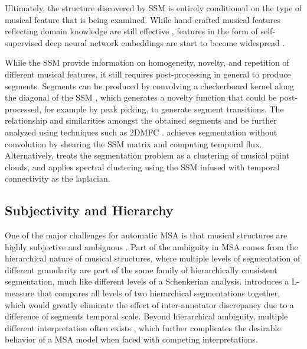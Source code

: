 Ultimately, the structure discovered by SSM is entirely conditioned on the type of musical feature that is being examined.
While hand-crafted musical features reflecting domain knowledge are still effective \citep{mcfee2014_spectral}, features in the form of self-supervised deep neural network embeddings are start to become widespread \citep{salamon2021, mccallum2019unsupervised}.

While the SSM provide information on homogeneity, novelty, and repetition of different musical features, it still requires post-processing in general to produce segments.
Segments can be produced by convolving a checkerboard kernel along the diagonal of the SSM \citep{foote2000automatic}, which generates a novelty function that could be post-processed, for example by peak picking, to generate segment transitions.
The relationship and similarities amongst the obtained segments and be further analyzed using techniques such as 2DMFC \citep{nieto2014}.
\cite{serra2014} achieves segmentation without convolution by shearing the SSM matrix and computing temporal flux.
Alternatively, \cite{mcfee2014_spectral} treats the segmentation problem as a clustering of musical point clouds, and applies spectral clustering using the SSM infused with temporal connectivity as the laplacian.

\subsection{Subjectivity and Hierarchy}
One of the major challenges for automatic MSA is that musical structures are highly subjective and ambiguous \citep{smith2014b}.
Part of the ambiguity in MSA comes from the hierarchical nature of musical structures, where multiple levels of segmentation of different granularity are part of the same family of hierarchically consistent segmentation, much like different levels of a Schenkerian analysis.
\cite{mcfee2017evaluating} introduces a L-measure that compares all levels of two hierarchical segmentations together, which would greatly eliminate the effect of inter-annotator discrepancy due to a difference of segments temporal scale.
Beyond hierarchical ambiguity, multiple different interpretation often exists \citep{wang2017, serra2014}, which further complicates the desirable behavior of a MSA model when faced with competing interpretations.

